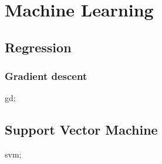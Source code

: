\chapter{Machine Learning}\label{chp:machine_learning}
\minitoc

\section{Regression}
\subsection{Gradient descent}\label{sec:gradient_descent}
\gls{gd};

\section{Support Vector Machine}
\gls{svm};